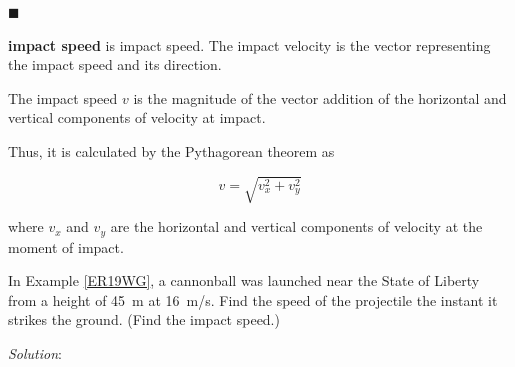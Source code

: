 \documentclass[dvipsnames]{article}
\begin{document}
\hfill $\blacksquare$

\textbf{\Gls{impact speed}} is \glsdesc{impact speed}. The impact velocity is the vector representing the impact speed and its direction. 

\begin{center}
\end{center}



The impact speed $v$ is the magnitude of the vector addition of the horizontal and vertical components of velocity at impact.


\begin{center}
\end{center}

Thus, it is calculated by the Pythagorean theorem as

\begin{equation} \label{KBgFF}
    v = \sqrt{v_x^2 + v_y^2}
\end{equation}

where $v_x$ and $v_y$ are the horizontal and vertical components of velocity at the moment of impact.

\begin{example}
    In Example \ref{ER19WG}, a cannonball was launched near the State of Liberty from a height of \SI{45}{m} at \SI{16}{m/s}. Find the speed of the projectile the instant it strikes the ground. (Find the impact speed.)
\end{example}

\textit{Solution}:
\end{document}
